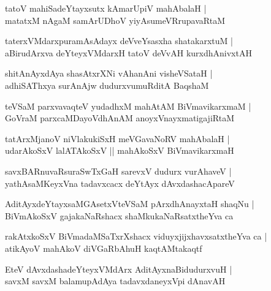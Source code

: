 \begin{shloka}
tatoV mahiSadeYtayxsutx kAmarUpiV mahAbalaH |\\
matatxM nAgaM samArUDhoV yiyAsumeVRrupavaRtaM
\end{shloka}

\begin{shloka}
taterxVMdarxpuramAsAdayx deVveYsasxha shatakarxtuM |\\
aBirudArxva deYteyxVMdarxH tatoV deVvAH kurxdhAnivxtAH 
\end{shloka}

\begin{shloka}
shitAnAyxdAya shasAtxrXNi vAhanAni visheVSataH |\\
adhiSAThxya surAnAjw dudurxvumuRditA BaqshaM 
\end{shloka}

\begin{shloka}
teVSaM parxvavaqteV yudadhxM mahAtAM BiVmavikarxmaM |\\
GoVraM parxcaMDayoVdhAnAM anoyxVnayxmatigajiRtaM
\end{shloka}

\begin{shloka}
tatArxMjanoV niVlakukiSxH meVGavaNoRV mahAbalaH |\\
udarAkoSxV lalATAkoSxV || mahAkoSxV BiVmavikarxmaH 
\end{shloka}

\begin{shloka}
savxBARnuvaRsuraSwTxGaH sarevxV dudurx vurAhaveV |\\
yathAsaMKeyxVna tadavxcacx deYtAyx dAvxdashacApareV 
\end{shloka}

\begin{shloka}
AditAyx\R deYtayxsaMGAsetxVteVSaM pArxdhAnayxtaH shaqNu |\\
BiVmAkoSxV gajakaNaRshacx shaMkukaNaRsatxtheYva ca 
\end{shloka}

\begin{shloka}
rakAtxkoSxV BiVmadaMSaTxrXshacx viduyxjijxhavxsatxtheYva ca |\\
atikAyoV mahAkoV diVGaRbAhuH kaqtAMtakaqtf 
\end{shloka}

\begin{shloka}
EteV dAvxdashadeYteyxVMdArx AditAyxnaBidudurxvuH |\\
savxM savxM balamupAdAya tadavxdaneyxVpi dAnavAH 
\end{shloka}

